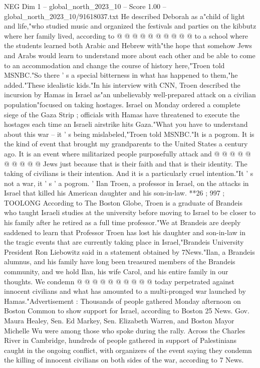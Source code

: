 \begin{textsample}{NEG Dim 1 – global\_north\_2023\_10 – Score 1.00 – global\_north\_2023\_10/91618037.txt}
He described Deborah as a"child of light and life,"who studied music and organized the festivals and parties on the kibbutz where her family lived, according to @ @ @ @ @ @ @ @ @ @ to a school where the students learned both Arabic and Hebrew with"the hope that somehow Jews and Arabs would learn to understand more about each other and be able to come to an accommodation and change the course of history here,"Troen told MSNBC."So there ' s a special bitterness in what has happened to them,"he added."These idealistic kids."In his interview with CNN, Troen described the incursion by Hamas in Israel as"an unbelievably well-prepared attack on a civilian population"focused on taking hostages.
Israel on Monday ordered a complete siege of the Gaza Strip ; officials with Hamas have threatened to execute the hostages each time an Israeli airstrike hits Gaza."What you have to understand about this war -- it ' s being mislabeled,"Troen told MSNBC."It is a pogrom.
It is the kind of event that brought my grandparents to the United States a century ago.
It is an event where militarized people purposefully attack and @ @ @ @ @ @ @ @ @ @ Jews just because that is their faith and that is their identity.
The taking of civilians is their intention.
And it is a particularly cruel intention."It ' s not a war, it ' s ' a pogrom. ' Ilan Troen, a professor in Israel, on the attacks in Israel that killed his American daughter and his son-in-law. **26 ; 997 ; TOOLONG According to The Boston Globe, Troen is a graduate of Brandeis who taught Israeli studies at the university before moving to Israel to be closer to his family after he retired as a full time professor."We at Brandeis are deeply saddened to learn that Professor Troen has lost his daughter and son-in-law in the tragic events that are currently taking place in Israel,"Brandeis University President Ron Liebowitz said in a statement obtained by 7News."Ilan, a Brandeis alumnus, and his family have long been treasured members of the Brandeis community, and we hold Ilan, his wife Carol, and his entire family in our thoughts.
We condemn @ @ @ @ @ @ @ @ @ @ today perpetrated against innocent civilians and what has amounted to a multi-pronged war launched by Hamas."Advertisement : Thousands of people gathered Monday afternoon on Boston Common to show support for Israel, according to Boston 25 News.
Gov.
Maura Healey, Sen.
Ed Markey, Sen.
Elizabeth Warren, and Boston Mayor Michelle Wu were among those who spoke during the rally.
Across the Charles River in Cambridge, hundreds of people gathered in support of Palestinians caught in the ongoing conflict, with organizers of the event saying they condemn the killing of innocent civilians on both sides of the war, according to 7 News.

\end{textsample}
